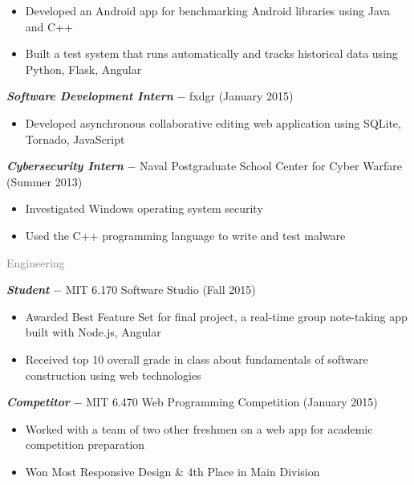 \documentclass[11pt]{article}
\newcommand{\rsection}[1]{\vspace{1em}\textcolor{gray}{\Large \robotoslab #1}\vspace{0.5em}}
\newcommand{\bt}[1]{\textit{\textbf{#1}}} %
\newcommand{\gap}[0]{\vspace{0.5em}} %
\newcommand{\dash}[0]{ $-$ } %
\begin{document}
\begin{itemize}
\item Developed an Android app for benchmarking Android libraries using Java and C++
\item Built a test system that runs automatically and tracks historical data using Python, Flask, Angular
\end{itemize}

\gap

\bt{Software Development Intern}\dash fxdgr (January 2015)

\begin{itemize}
\item Developed asynchronous collaborative editing web application using SQLite, Tornado, JavaScript
\end{itemize}

\gap

\bt{Cybersecurity Intern}\dash Naval Postgraduate School Center for Cyber Warfare (Summer 2013)

\begin{itemize}
\item Investigated Windows operating system security
\item Used the C++ programming language to write and test malware
\end{itemize}

\rsection{Engineering}

\bt{Student}\dash MIT 6.170 Software Studio (Fall 2015)

\begin{itemize}
\item Awarded Best Feature Set for final project, a real-time group note-taking app built with Node.js, Angular
\item Received top 10 overall grade in class about fundamentals of software construction using web technologies
\end{itemize}

\gap

\bt{Competitor}\dash MIT 6.470 Web Programming Competition (January 2015)

\begin{itemize}
\item Worked with a team of two other freshmen on a web app for academic competition preparation
\item Won Most Responsive Design \& 4th Place in Main Division
\end{itemize}

\gap
\end{document}

